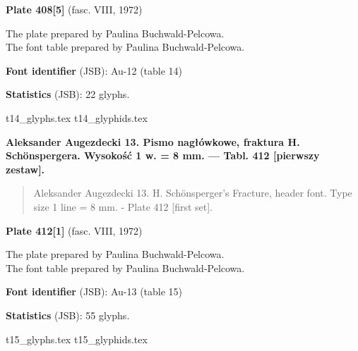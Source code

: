 \documentclass[12pt]{article}
\newcommand{\bg}{\begingl}
\newcommand{\pismoPL}[1]{{\relsize{2}\Junicode\textbf{#1}}}
\newcommand{\pismoEN}[1]{{\relsize{1}\Junicode\begin{quote}#1\end{quote}}}
\newcommand{\plate}[3]{\textbf{Plate #1} (fasc. #2, #3)}
\newcommand{\fontID}[2]{{\relsize{1}\Junicode\textbf{Font identifier} (JSB): #1 (table #2)}}
\newcommand{\fontstat}[1]{{\relsize{1}\Junicode\textbf{Statistics} (JSB): #1 glyphs.}}
\begin{document}
\plate{408[5]}{VIII}{1972}

The plate    prepared by Paulina Buchwald-Pelcowa.\\
The font table    prepared by Paulina Buchwald-Pelcowa.\\


\bigskip

\fontID{Au-12}{14}

\fontstat{22}

  {t14_glyphs.tex}
  {t14_glyphids.tex}

\newpage
 



\pismoPL{Aleksander Augezdecki 13. Pismo  nagłówkowe,
  fraktura H. Schönspergera. Wysokość 1 w. = 8 mm. — Tabl. 412 [pierwszy zestaw].}

\pismoEN{Aleksander Augezdecki 13. H. Schönsperger's Fracture, header font. Type size 1 line = 8 mm. - Plate 412 [first set].}
\medskip

\plate{412[1]}{VIII}{1972}

The plate    prepared by Paulina Buchwald-Pelcowa.\\
The font table    prepared by Paulina Buchwald-Pelcowa.\\

\bigskip

\fontID{Au-13}{15}

\fontstat{55}

  {t15_glyphs.tex}
  {t15_glyphids.tex}



\newpage
 

\end{document}
